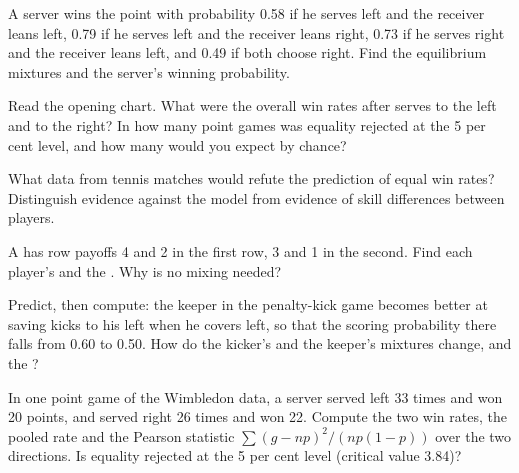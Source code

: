 \begin{exercise}[$\star$]\label{exo:b2:mixed-strategies:2}
A server wins the point with probability 0.58 if he serves left and the receiver leans left, 0.79 if he serves
left and the receiver leans right, 0.73 if he serves right and the receiver leans left, and 0.49 if both choose
right. Find the equilibrium mixtures and the server's winning probability.
\end{exercise}

\begin{exercise}[$\star$]\label{exo:b2:mixed-strategies:3}
Read the opening chart. What were the overall win rates after serves to the left and to the right? In how many
point games was equality rejected at the 5 per cent level, and how many would you expect by chance?
\end{exercise}

\begin{exercise}[$\star$]\label{exo:b2:mixed-strategies:4}
What data from tennis matches would refute the prediction of equal win rates? Distinguish evidence against the
model from evidence of skill differences between players.
\end{exercise}

\begin{exercise}[$\star\star$]\label{exo:b2:mixed-strategies:5}
A  has row payoffs 4 and 2 in the first row, 3 and 1 in the second. Find each player's  and the . Why is no mixing needed?
\end{exercise}

\begin{exercise}[$\star\star$]\label{exo:b2:mixed-strategies:6}
Predict, then compute: the keeper in the penalty-kick game becomes better at saving kicks to his left when he
covers left, so that the scoring probability there falls from 0.60 to 0.50. How do the kicker's and the keeper's
mixtures change, and the ?
\end{exercise}

\begin{exercise}[$\star\star$]\label{exo:b2:mixed-strategies:7}
In one point game of the Wimbledon data, a server served left 33 times and won 20 points, and served right 26
times and won 22. Compute the two win rates, the pooled rate and the Pearson statistic $\sum (g - np)^2/(np(1 -
p))$ over the two directions. Is equality rejected at the 5 per cent level (critical value 3.84)?
\end{exercise}


